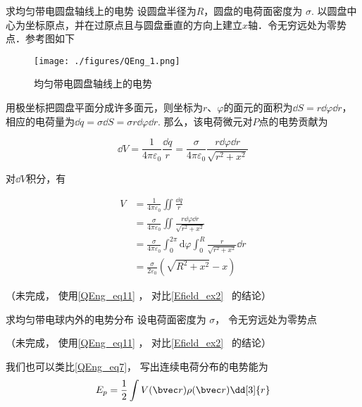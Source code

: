 \begin{example}{求均匀带电圆盘轴线上的电势}
设圆盘半径为$R$，圆盘的电荷面密度为 $\sigma$. 以圆盘中心为坐标原点，并在过原点且与圆盘垂直的方向上建立$x$轴．令无穷远处为零势点．参考图如下
\begin{figure}[ht]
\centering
\texttt{[image: ./figures/QEng\_1.png]}
\caption{均匀带电圆盘轴线上的电势} \label{QEng_fig1}
\end{figure}

用极坐标把圆盘平面分成许多面元，则坐标为$r$、$\varphi$的面元的面积为$\dd S=r\dd \varphi \dd r$，相应的电荷量为$\dd q=\sigma\dd S=\sigma r\dd \varphi \dd r$. 那么，该电荷微元对$P$点的电势贡献为

\begin{equation}
\dd V =\frac{1}{4 \pi \varepsilon_{0}}\frac{\dd q }{r}=\frac{\sigma}{4 \pi\varepsilon_{0} }\frac{r \dd \varphi \dd r}{ \sqrt{r^{2}+x^{2}}}
\end{equation}

对$\dd V$积分，有

\begin{equation}
\begin{aligned}
V & =\frac{1}{4 \pi \varepsilon_{0}}\iint \frac{\dd q }{r}\\
& =\frac{\sigma }{4 \pi \varepsilon_{0}}\iint \frac{r \dd \varphi \dd r}{ \sqrt{r^{2}+x^{2}}}\\
& = \frac{\sigma}{4 \pi \varepsilon_{0}} \int_{0}^{2 \pi} \mathrm{d} \varphi \int_{0}^{R} \frac{r}{\sqrt{r^{2}+x^{2}}}\dd r\\ 
& = \frac{\sigma}{2 \varepsilon_{0}}\left(\sqrt{R^{2}+x^{2}}-x\right)
\end{aligned}
\end{equation}


（未完成， 使用\autoref{QEng_eq11} ， 对比\autoref{Efield_ex2}~ 的结论）
\end{example}

\begin{example}{求均匀带电球内外的电势分布}
设电荷面密度为 $\sigma$， 令无穷远处为零势点

（未完成， 使用\autoref{QEng_eq11} ， 对比\autoref{Efield_ex2}~ 的结论）
\end{example}

我们也可以类比\autoref{QEng_eq7}， 写出连续电荷分布的电势能为
\begin{equation}\label{QEng_eq8}
E_p = \frac 12 \int V(\bvec r) \rho(\bvec r) \dd[3]{r}
\end{equation}

